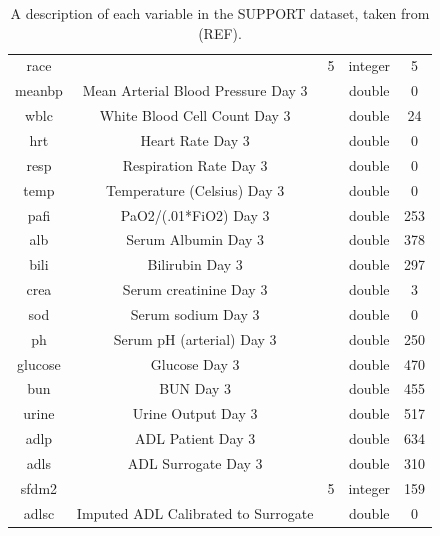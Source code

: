 \documentclass[
]{jss}
\begin{document}
\begin{table}[ht]
\begin{tabular}{ccccc}
race          &                                          & 5               & integer          & 5            \\
meanbp        & Mean Arterial Blood Pressure Day 3       &                 & double           & 0            \\
wblc          & White Blood Cell Count Day 3             &                 & double           & 24           \\
hrt           & Heart Rate Day 3                         &                 & double           & 0            \\
resp          & Respiration Rate Day 3                   &                 & double           & 0            \\
temp          & Temperature (Celsius) Day 3              &                 & double           & 0            \\
pafi          & PaO2/(.01*FiO2) Day 3                    &                 & double           & 253          \\
alb           & Serum Albumin Day 3                      &                 & double           & 378          \\
bili          & Bilirubin Day 3                          &                 & double           & 297          \\
crea          & Serum creatinine Day 3                   &                 & double           & 3            \\
sod           & Serum sodium Day 3                       &                 & double           & 0            \\
ph            & Serum pH (arterial) Day 3                &                 & double           & 250          \\
glucose       & Glucose Day 3                            &                 & double           & 470          \\
bun           & BUN Day 3                                &                 & double           & 455          \\
urine         & Urine Output Day 3                       &                 & double           & 517          \\
adlp          & ADL Patient Day 3                        &                 & double           & 634          \\
adls          & ADL Surrogate Day 3                      &                 & double           & 310          \\
sfdm2         &                                          & 5               & integer          & 159          \\
adlsc         & Imputed ADL Calibrated to Surrogate      &                 & double           & 0           
\end{tabular}
\caption{A description of each variable in the SUPPORT dataset, taken from (REF).}
\label{tab:support1}
\end{table}
\end{document}
